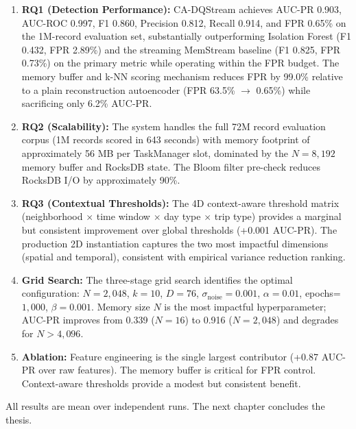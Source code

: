\begin{enumerate}
\item \textbf{RQ1 (Detection Performance):} CA-DQStream achieves AUC-PR 0.903, AUC-ROC 0.997, F1 0.860, Precision 0.812, Recall 0.914, and FPR 0.65\% on the 1M-record evaluation set, substantially outperforming Isolation Forest (F1 0.432, FPR 2.89\%) and the streaming MemStream baseline (F1 0.825, FPR 0.73\%) on the primary metric while operating within the FPR budget. The memory buffer and k-NN scoring mechanism reduces FPR by 99.0\% relative to a plain reconstruction autoencoder (FPR 63.5\% $\rightarrow$ 0.65\%) while sacrificing only 6.2\% AUC-PR.

\item \textbf{RQ2 (Scalability):} The system handles the full 72M record evaluation corpus (1M records scored in 643 seconds) with memory footprint of approximately 56 MB per TaskManager slot, dominated by the $N=8{,}192$ memory buffer and RocksDB state. The Bloom filter pre-check reduces RocksDB I/O by approximately 90\%.

\item \textbf{RQ3 (Contextual Thresholds):} The 4D context-aware threshold matrix (neighborhood $\times$ time window $\times$ day type $\times$ trip type) provides a marginal but consistent improvement over global thresholds (+0.001 AUC-PR). The production 2D instantiation captures the two most impactful dimensions (spatial and temporal), consistent with empirical variance reduction ranking.

\item \textbf{Grid Search:} The three-stage grid search identifies the optimal configuration: $N=2{,}048$, $k=10$, $D=76$, $\sigma_{\mathrm{noise}}=0.001$, $\alpha=0.01$, epochs=$1{,}000$, $\beta=0.001$. Memory size $N$ is the most impactful hyperparameter; AUC-PR improves from 0.339 ($N=16$) to 0.916 ($N=2{,}048$) and degrades for $N > 4{,}096$.

\item \textbf{Ablation:} Feature engineering is the single largest contributor (+0.87 AUC-PR over raw features). The memory buffer is critical for FPR control. Context-aware thresholds provide a modest but consistent benefit.
\end{enumerate}

All results are mean over independent runs. The next chapter concludes the thesis.
